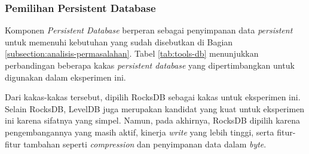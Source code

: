 \subsubsection{Pemilihan Persistent Database}
\label{subsubsection:persistent-database}

Komponen \textit{Persistent Database} berperan sebagai penyimpanan data \textit{persistent} untuk memenuhi kebutuhan yang sudah disebutkan di Bagian \ref{subsection:analisis-permasalahan}. Tabel \ref{tab:tools-db} menunjukkan perbandingan beberapa kakas \textit{persistent database} yang dipertimbangkan untuk digunakan dalam eksperimen ini.

Dari kakas-kakas tersebut, dipilih RocksDB sebagai kakas untuk eksperimen ini. Selain RocksDB, LevelDB juga merupakan kandidat yang kuat untuk eksperimen ini karena sifatnya yang simpel. Namun, pada akhirnya, RocksDB dipilih karena pengembangannya yang masih aktif, kinerja \textit{write} yang lebih tinggi, serta fitur-fitur tambahan seperti \textit{compression} dan penyimpanan data dalam \textit{byte}.

